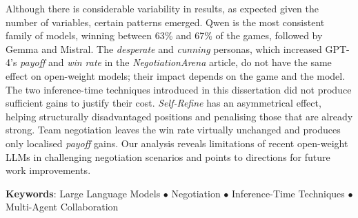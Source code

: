 Although there is considerable variability in results, as expected given the number of variables, certain patterns emerged. Qwen is the most consistent family of models, winning between 63\% and 67\% of the games, followed by Gemma and Mistral. The \textit{desperate} and \textit{cunning} personas, which increased GPT-4's \textit{payoff} and \textit{win rate} in the \textit{NegotiationArena} article, do not have the same effect on open-weight models; their impact depends on the game and the model. The two inference-time techniques introduced in this dissertation did not produce sufficient gains to justify their cost. \textit{Self-Refine} has an asymmetrical effect, helping structurally disadvantaged positions and penalising those that are already strong. Team negotiation leaves the win rate virtually unchanged and produces only localised \textit{payoff} gains. Our analysis reveals limitations of recent open-weight LLMs in challenging negotiation scenarios and points to directions for future work improvements.

\vspace{\fill}
\begin{flushleft}
{\Large \textbf{Keywords}:} 
Large Language Models \(\bullet\) 
Negotiation \(\bullet\)
Inference-Time Techniques \(\bullet\)
Multi-Agent Collaboration
\end{flushleft}
\vspace*{24mm}

\acresetall %

